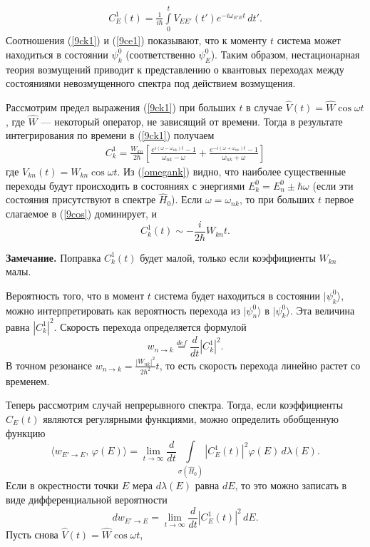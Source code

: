 \documentclass[a4paper
]{article}
\begin{document}
\begin{align}
\label{9ce1}
C^1_E(t)=\frac{1}{i\hbar}\int \limits_0^t V_{EE'}(t')e^{-i\omega_{E'E}t}
\, dt'.
\end{align}
Соотношения (\ref{9ck1}) и (\ref{9ce1}) показывают, что к моменту $t$
система может находиться в состоянии $\psi^0_k$ (соответственно $\psi^0_E$). Таким
образом, нестационарная теория возмущений приводит к представлению о
квантовых переходах между состояниями невозмущенного спектра под
действием возмущения. \par
Рассмотрим предел выражения (\ref{9ck1}) при больших $t$ в случае
$\hat V(t)=\hat W\cos \omega t$, где $\hat W$ --- некоторый оператор,
не зависящий от времени. Тогда в результате интегрирования по времени в
(\ref{9ck1}) получаем
\begin{align}
\label{9cos}
C^1_k=\frac{W_{kn}}{2\hbar}\left[\frac{e^{i(\omega-\omega_{nk})t}-1}
{\omega_{nk}-\omega}+\frac{e^{-i(\omega+\omega_{nk})t}-1}{\omega_{nk}+
\omega}\right]
\end{align}
где $V_{kn}(t)=W_{kn}\cos \omega t$.
Из (\ref{omegank}) видно, что наиболее существенные переходы будут
происходить в состояниях с энергиями $E^0_k=E^0_n\pm \hbar \omega$
(если эти состояния присутствуют в спектре $\hat H_0$). Если $\omega =\omega _{nk}$,
то при больших $t$ первое слагаемое в (\ref{9cos})
доминирует, и $$C^1_k(t)\sim -\frac{i}{2\hbar}W_{kn}t.$$ \par
{\bf Замечание.} Поправка $C^1_k(t)$ будет малой, только если коэффициенты
$W_{kn}$ малы. \par
Вероятность того, что в момент $t$ система будет находиться в состоянии
$|\psi^0_k\rangle$, можно интерпретировать как вероятность перехода из
$|\psi^0_n\rangle$ в $|\psi^0_k\rangle$. Эта величина равна $|C^1_k|^2$.
Скорость перехода определяется формулой $$w_{n\rightarrow k}\stackrel{def}
{=}\frac{d}{dt}|C^1_k|^2.$$ В точном резонансе $w_{n\rightarrow k}=
\frac{|W_{nk}|^2}{2\hbar^2}t$, то есть скорость перехода линейно растет со
временем. \par
Теперь рассмотрим случай непрерывного спектра. Тогда, если коэффициенты
$C_E(t)$ являются регулярными функциями, можно определить обобщенную
функцию $$\langle w_{E'\rightarrow E}, \, \varphi(E)\rangle=\lim \limits
_{t\rightarrow \infty}\frac{d}{dt}\int \limits _{\sigma(\hat H_0)}
|C^1_E(t)|^2\varphi(E)\, d\lambda(E).$$ Если в окрестности точки $E$
мера $d\lambda(E)$ равна $dE$, то это можно записать в виде
дифференциальной вероятности $$dw_{E'\rightarrow E}=\lim _{t\rightarrow
\infty}\frac{d}{dt}|C^1_E(t)|^2\, dE.$$ Пусть снова $\hat V(t)=\hat W\cos \omega t$,
\end{document}
